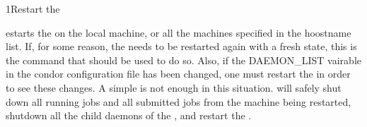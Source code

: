 \begin{ManPage}{}{1}{Restart the }
\label{man-condor-restart}
\Synopsis {}

\Description 

 estarts the  on the local machine, or all the
machines specified in the hoostname list.  If, for some reason, the
 needs to be restarted again with a fresh state, this is the
command that should be used to do so.  Also, if the DAEMON\_LIST vairable in
the condor configuration file has been changed, one must restart the
 in order to see these changes.  A simple 
is not enough in this situation.   will safely shut down
all running jobs and all submitted jobs from the machine being restarted,
shutdown all the child daemons of the , and restart the
.

\begin{Options}
\end{Options}

\end{ManPage}
